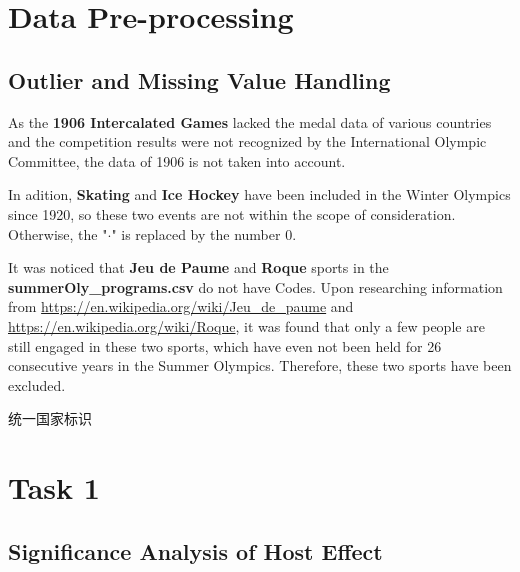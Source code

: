 \documentclass{mcmthesis}
\begin{document}
	\section{Data Pre-processing}
	
	\subsection{Outlier and Missing Value Handling}
	As the \textbf{1906 Intercalated Games} lacked the medal data of various countries and the competition results were not recognized by the International Olympic Committee, the data of 1906 is not taken into account.
	
	In adition, \textbf{Skating} and \textbf{Ice Hockey} have been included in the Winter Olympics since 1920, so these two events are not within the scope of consideration. Otherwise, the "$\cdot$" is replaced by the number $0$. 
	
	It was noticed that \textbf{Jeu de Paume} and \textbf{Roque} sports in the {\bf summerOly\_programs.csv} do not have Codes. Upon researching information from {\color{blue}\url{https://en.wikipedia.org/wiki/Jeu_de_paume}} and {\color{blue}\url{https://en.wikipedia.org/wiki/Roque}}, it was found that only a few people are still engaged in these two sports, which have even not been held for 26 consecutive years in the Summer Olympics. Therefore, these two sports have been excluded.
	
	
	
	统一国家标识
	
	
	
	
	
	
	
	
	
	
	
	
	
	\section{Task 1}
	
	\subsection{Significance Analysis of Host Effect}
	
\end{document}
